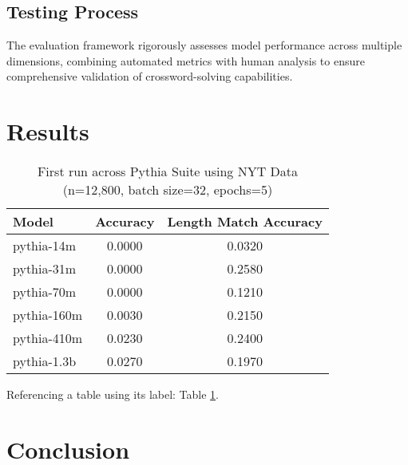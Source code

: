 \documentclass[
	a4paper, %
	10pt, %
	unnumberedsections, %
	twoside, %
]{LTJournalArticle}
\begin{document}
\subsection{Testing Process}

The evaluation framework rigorously assesses model performance across multiple dimensions, combining automated metrics with human analysis to ensure comprehensive validation of crossword-solving capabilities.


\section{Results}

\begin{table}[h] %
	\centering
	\begin{tabular}{l c c}
		\toprule
		Model & Accuracy & Length Match Accuracy \\
		\midrule
		pythia-14m & 0.0000 & 0.0320 \\
		pythia-31m & 0.0000 & 0.2580 \\
		pythia-70m & 0.0000 & 0.1210 \\
		pythia-160m & 0.0030 & 0.2150 \\
		pythia-410m & 0.0230 & 0.2400 \\
		pythia-1.3b & 0.0270 & 0.1970 \\
		\bottomrule
	\end{tabular}
	\label{tab:pythiarun1}
	\caption{First run across Pythia Suite using NYT Data (n=12,800, batch size=32, epochs=5)}
\end{table}

Referencing a table using its label: Table \ref{tab:pythiarun1}.


\section{Conclusion}



\printbibliography %

\end{document}
